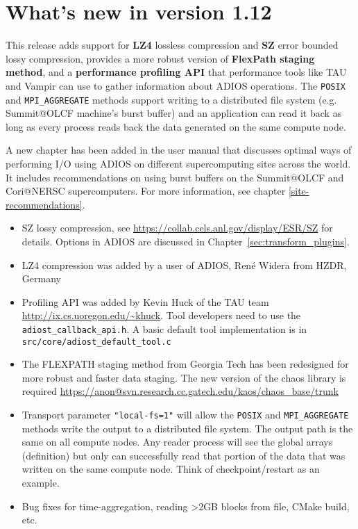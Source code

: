 %
%
\section {What's new in version 1.12}
This release adds support for {\bf LZ4} lossless compression and {\bf SZ} error bounded lossy compression, provides a more robust version of {\bf FlexPath staging method}, and a {\bf performance profiling API} that performance tools like TAU and Vampir can use to gather information about ADIOS operations. The \verb+POSIX+ and \verb+MPI_AGGREGATE+ methods support writing to a distributed file system (e.g. Summit@OLCF machine's burst buffer) and an application can read it back as long as every process reads back the data generated on the same compute node. 

A new chapter has been added in the user manual that discusses optimal ways of performing I/O using ADIOS on different supercomputing sites across the world.
It includes recommendations on using burst buffers on the Summit@OLCF and Cori@NERSC supercomputers.
For more information, see chapter \ref{site-recommendations}.

\begin{itemize}
\item SZ lossy compression, see  \url{https://collab.cels.anl.gov/display/ESR/SZ} for details. Options in ADIOS are discussed in Chapter~\ref{sec:transform_plugins}.
\item LZ4 compression was added by a user of ADIOS, René Widera from HZDR, Germany
\item Profiling API was added by Kevin Huck of the TAU team \url{http://ix.cs.uoregon.edu/~khuck}. Tool developers need to use the \verb+adiost_callback_api.h+. A basic default tool implementation is in \newline \verb+src/core/adiost_default_tool.c+
\item The FLEXPATH staging method from Georgia Tech has been redesigned for more robust and faster data staging. The new version of the chaos library is required \url{https://anon@svn.research.cc.gatech.edu/kaos/chaos_base/trunk}
\item Transport parameter \verb+"local-fs=1"+ will allow the \verb+POSIX+ and \verb+MPI_AGGREGATE+ methods write the output to a distributed file system. The output path is the same on all compute nodes. Any reader process will see the global arrays (definition) but only can successfully read that portion of the data that was written on the same compute node. Think of checkpoint/restart as an example.
\item Bug fixes for time-aggregation, reading >2GB blocks from file, CMake build, etc.
\end{itemize}




